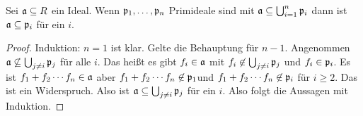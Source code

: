 \begin{Lemma}[Primvermeidung]
    Sei $\mathfrak{a}\subseteq R$ ein Ideal. Wenn $\mathfrak{p}_1,\dots,\mathfrak{p}_n$ Primideale sind mit $\mathfrak{a}\subseteq \bigcup_{i=1}^n\mathfrak{p}_i$ dann ist $\mathfrak{a}\subseteq \mathfrak{p}_i$ für ein $i$.
    
\end{Lemma}
\begin{proof}
    Induktion: $n=1$ ist klar. Gelte die Behauptung für $n-1$. Angenommen $\mathfrak{a}\not\subseteq \bigcup_{j\neq i}\mathfrak{p}_j$ für alle $i$. Das heißt es gibt $f_i\in\mathfrak{a}$ mit $f_i\not\in\bigcup_{j\neq i}\mathfrak{p}_j$ und $f_i\in\mathfrak{p}_i$.
    Es ist $f_1+f_2\cdots f_n\in\mathfrak{a}$ aber $f_1+f_2\cdots f_n\not\in \mathfrak{p}_1$und $f_1+f_2\cdots f_n\not\in\mathfrak{p}_i$ für $i\geq 2$. Das ist ein Widerspruch. Also ist $\mathfrak{a}\subseteq \bigcup_{j\neq i}\mathfrak{p}_j$ für ein $i$. Also folgt die Aussagen mit Induktion.
\end{proof}

